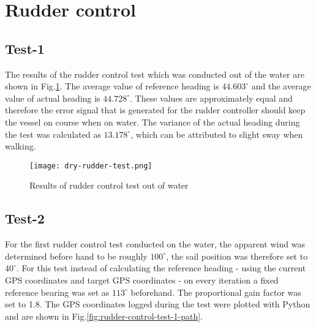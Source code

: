 \section{Rudder control}
\subsection{Test-1}
\label{test-1}

The results of the rudder control test which was conducted out of the water are shown in Fig.\ref{fig:rudder-control-dry}. The average value of reference heading is $44.603^{\circ}$ and the average value of actual 
heading is $44.728^{\circ}$. These values are approximately equal and therefore the error signal that is generated for the rudder controller should keep the vessel on course when on water. The variance of the 
actual heading during the test was calculated as $13.178^{\circ}$, which can be attributed to slight sway when walking.  

\begin{figure}[h!]
    \centering
    \texttt{[image: dry-rudder-test.png]}
    \caption[Rudder control test out of water]{Results of rudder control test out of water}
    \label{fig:rudder-control-dry}
\end{figure}


\subsection{Test-2}
\label{test-2}

For the first rudder control test conducted on the water, the apparent wind was determined before hand to be roughly $100^{\circ}$, the sail position was therefore set to $40^{\circ}$.%
For this test instead of calculating the reference heading - using the current GPS coordinates and target GPS coordinates - on every iteration a fixed reference bearing was set as $113^{\circ}$ 
beforehand. The proportional gain factor was set to 1.8. The GPS coordinates logged during the test were plotted with Python and are shown in Fig.\ref{fig:rudder-control-test-1-path}. 

